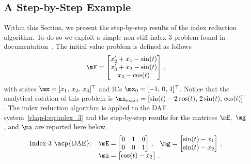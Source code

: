 \subsection{A Step-by-Step Example}
\label{chap4:sec:step_by_step}

Within this Section, we present the step-by-step results of the index reduction algorithm. To do so we exploit a simple non-stiff index-3 problem found in \Wolfram{}~\Mathematica{} documentation~\cite{mathematica}. The initial value problem is defined as follows
%
\begin{equation}
  \label{chap4:eq:index_3}
  \mF = \begin{bmatrix}
    x^{\prime}_{2} + x_{1} - \sin(t) \\
    x^{\prime}_{3} + x_{2} - \sin(t) \\
    x_{3} - \cos(t)
  \end{bmatrix} \, \text{,}
\end{equation}
%
with states $\mx = [x_{1}, \, x_{2}, \, x_{3}]^\top$ and \acp{IC} $\mx_{0} = [-1, \, 0, \, 1]^\top$. Notice that the analytical solution of this problem is $\mx_\text{exact} = [\sin(t) - 2\cos(t), \, 2\sin(t), \, \cos(t)]^\top$. The index reduction algorithm is applied to the \ac{DAE} system~\eqref{chap4:eq:index_3} and the step-by-step results for the matrices $\mE$, $\mg$, and $\ma$ are reported here below.
%
\begin{equation*}
  \begin{array}{l}
    \text{Index-3 \acp{DAE}:} \quad \mE = \begin{bmatrix}
      0 & 1 & 0 \\
      0 & 0 & 1
    \end{bmatrix} \, \text{,} \quad
    \mg = \begin{bmatrix}
      \sin(t) - x_{1} \\
      \sin(t) - x_{2}
    \end{bmatrix} \, \text{,} \\[0.5em]
    \phantom{\text{Index-3 \acp{DAE}:}} \quad \ma = \begin{bmatrix}
      \cos(t) - x_{3}
    \end{bmatrix} \, \text{.} \\[1.0em]
  \end{array}
\end{equation*}
